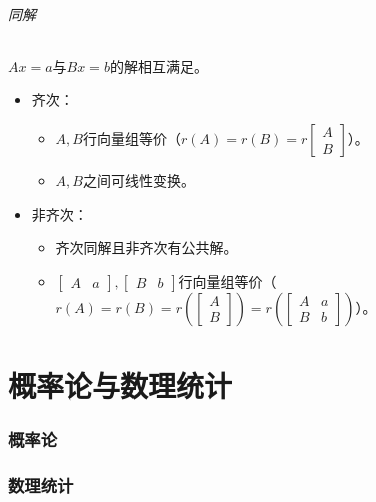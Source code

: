 \documentclass[
12pt, %
a4paper, 
oneside, %
]{scrartcl}
\begin{document}
\paragraph{同解}
$ Ax = a $与$ Bx = b $的解相互满足。
\begin{itemize}
\item 齐次：
\begin{itemize}
\item $ A, B $行向量组等价（$ r(A) = r(B) = r \begin{bmatrix} A \\ B \end{bmatrix} $）。
\item $ A, B $之间可线性变换。
\end{itemize}
\item 非齐次：
\begin{itemize}
\item 齐次同解且非齐次有公共解。
\item $ \begin{bmatrix} A & a \end{bmatrix}, \begin{bmatrix} B & b \end{bmatrix} $行向量组等价（$ r(A) = r(B) = r(\begin{bmatrix} A \\ B \end{bmatrix}) = r(\begin{bmatrix} A & a \\ B & b \end{bmatrix}) $）。
\end{itemize}
\end{itemize}
\newpage
\part{概率论与数理统计}
\section{概率论}
\section{数理统计}
\end{document}

